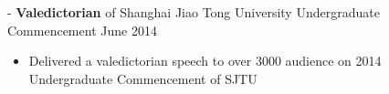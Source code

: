 \documentclass[11pt]{res}
\newcommand{\style}[1]{\color{Blue}\large\textsc{#1}}
\begin{document}
\begin{resume}
    -\sectionwidth \resumewidth 
  \textbf{Valedictorian} of Shanghai Jiao Tong University Undergraduate Commencement   \hfill{June 2014}  \hspace{-0.58in}\vspace{-0mm}
   \begin{itemize}[leftmargin=-0.1in]
  \item Delivered a valedictorian speech to over 3000 audience on 2014 Undergraduate Commencement of SJTU
%  
     \end{itemize}\vspace{-25pt}

\begin{comment}
\rule{18cm}{0.5mm}\\
\parshape 1 -\sectionwidth \resumewidth
\vspace{-25pt}
\section{\style{Honors And Awards}}
  \vspace{-5pt}

    \begin{tabbing}
   \hspace{5.3in}\= \hspace{2.6in}\= \kill %
  \textbf{Department Leader} of Student Science, Technology and Innovation Association  \> 2010 - 2014
    \end{tabbing}\vspace{-15pt}%


\end{comment}
\end{resume}
\end{document}

